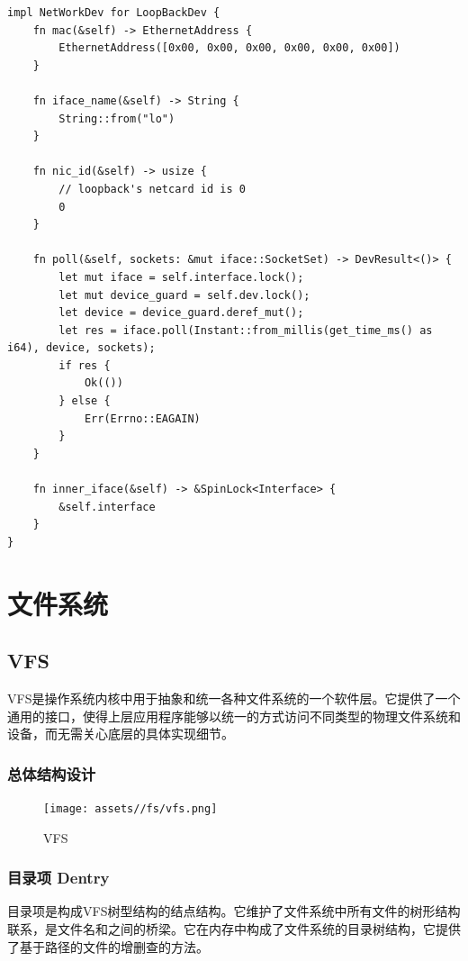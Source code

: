 \documentclass{article}
\begin{document}
\begin{lstlisting}
impl NetWorkDev for LoopBackDev {
    fn mac(&self) -> EthernetAddress {
        EthernetAddress([0x00, 0x00, 0x00, 0x00, 0x00, 0x00])
    }

    fn iface_name(&self) -> String {
        String::from("lo")
    }

    fn nic_id(&self) -> usize {
        // loopback's netcard id is 0
        0
    }

    fn poll(&self, sockets: &mut iface::SocketSet) -> DevResult<()> {
        let mut iface = self.interface.lock();
        let mut device_guard = self.dev.lock();
        let device = device_guard.deref_mut();
        let res = iface.poll(Instant::from_millis(get_time_ms() as i64), device, sockets);
        if res {
            Ok(())
        } else {
            Err(Errno::EAGAIN)
        }
    }

    fn inner_iface(&self) -> &SpinLock<Interface> {
        &self.interface
    }
}
\end{lstlisting}



\newpage
\section{文件系统}

\subsection{VFS}
VFS是操作系统内核中用于抽象和统一各种文件系统的一个软件层。它提供了一个通用的接口，使得上层应用程序能够以统一的方式访问不同类型的物理文件系统和设备，而无需关心底层的具体实现细节。

\subsubsection{总体结构设计}
\begin{figure}[H]
    \centering
    \texttt{[image: assets//fs/vfs.png]}
    \caption{VFS}
    \label{VFS}
\end{figure}

\subsubsection{目录项 Dentry}
目录项是构成VFS树型结构的结点结构。它维护了文件系统中所有文件的树形结构联系，是文件名和之间的桥梁。它在内存中构成了文件系统的目录树结构，它提供了基于路径的文件的增删查的方法。
\end{document}
